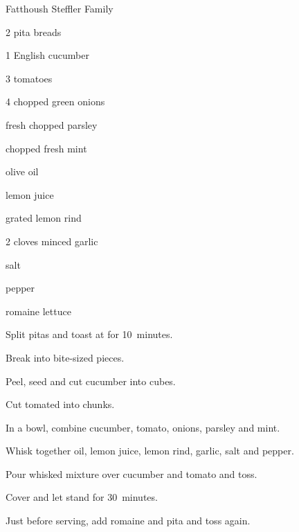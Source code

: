 \begin{recipe}{ Fatthoush }{Steffler Family}{}

\begin{ingredients}
\item 2 pita breads
\item 1 English cucumber
\item 3 tomatoes
\item 4 chopped green onions
\item \C{\half} fresh chopped parsley
\item \C{\quarter} chopped fresh mint
\item {} olive oil
\item {} lemon juice
\item {} grated lemon rind
\item 2 cloves minced garlic
\item \tp{\half} salt
\item \tp{\half} pepper
\item {} romaine lettuce
\end{ingredients}

\begin{directions}
\item Split pitas and toast at  for 10~minutes.
\item Break into bite-sized pieces.
\item Peel, seed and cut cucumber into  cubes.
\item Cut tomated into  chunks.
\item In a bowl, combine cucumber, tomato, onions, parsley and mint.
\item Whisk together oil, lemon juice, lemon rind, garlic, salt and pepper.
\item Pour whisked mixture over cucumber and tomato and toss.
\item Cover and let stand for 30~minutes.
\item Just before serving, add romaine and pita and toss again.
\end{directions}
\end{recipe}

